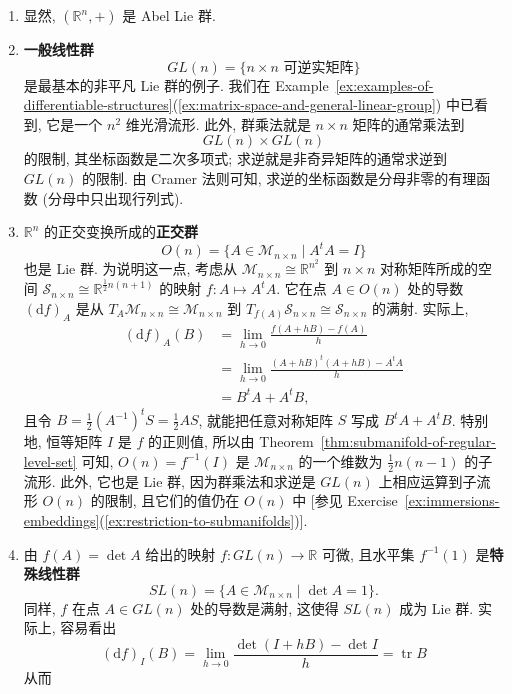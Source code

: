 \begin{RiemannExample}\label{ex:classical-matrix-lie-groups}
\begin{enumerate}[label=(\arabic*),ref=\arabic*,leftmargin=*]
\item 显然, $(\mathbb{R}^n,+)$ 是 Abel Lie 群.
\item \textbf{一般线性群}
\[
  GL(n)=\{n\times n\text{ 可逆实矩阵}\}
\]
是最基本的非平凡 Lie 群的例子. 我们在 Example~\ref{ex:examples-of-differentiable-structures}(\ref{ex:matrix-space-and-general-linear-group}) 中已看到, 它是一个 $n^2$ 维光滑流形. 此外, 群乘法就是 $n\times n$ 矩阵的通常乘法到
\[
  GL(n)\times GL(n)
\]
的限制, 其坐标函数是二次多项式; 求逆就是非奇异矩阵的通常求逆到 $GL(n)$ 的限制. 由 Cramer 法则可知, 求逆的坐标函数是分母非零的有理函数 (分母中只出现行列式).
\item\label{ex:orthogonal-group-regular-level-set} $\mathbb{R}^n$ 的正交变换所成的\textbf{正交群}
\[
  O(n)=\{A\in\mathcal M_{n\times n}\mid A^tA=I\}
\]
也是 Lie 群. 为说明这一点, 考虑从 $\mathcal M_{n\times n}\cong\mathbb{R}^{n^2}$ 到 $n\times n$ 对称矩阵所成的空间 $\mathcal S_{n\times n}\cong\mathbb{R}^{\frac12 n(n+1)}$ 的映射 $f:A\mapsto A^tA$. 它在点 $A\in O(n)$ 处的导数 $(\mathrm{d}f)_A$ 是从 $T_A\mathcal M_{n\times n}\cong\mathcal M_{n\times n}$ 到 $T_{f(A)}\mathcal S_{n\times n}\cong\mathcal S_{n\times n}$ 的满射. 实际上,
\begin{align*}
  (\mathrm{d}f)_A(B)
  &=\lim_{h\to0}\frac{f(A+hB)-f(A)}{h}\\
  &=\lim_{h\to0}\frac{(A+hB)^t(A+hB)-A^tA}{h}\\
  &=B^tA+A^tB,
\end{align*}
且令 $B=\frac12(A^{-1})^tS=\frac12 AS$, 就能把任意对称矩阵 $S$ 写成 $B^tA+A^tB$. 特别地, 恒等矩阵 $I$ 是 $f$ 的正则值, 所以由 Theorem~\ref{thm:submanifold-of-regular-level-set} 可知, $O(n)=f^{-1}(I)$ 是 $\mathcal M_{n\times n}$ 的一个维数为 $\frac12 n(n-1)$ 的子流形. 此外, 它也是 Lie 群, 因为群乘法和求逆是 $GL(n)$ 上相应运算到子流形 $O(n)$ 的限制, 且它们的值仍在 $O(n)$ 中 [参见 Exercise~\ref{ex:immersions-embeddings}(\ref{ex:restriction-to-submanifolds})].
\item\label{ex:special-linear-group-regular-level-set} 由 $f(A)=\det A$ 给出的映射 $f:GL(n)\to\mathbb{R}$ 可微, 且水平集 $f^{-1}(1)$ 是\textbf{特殊线性群}
\[
  SL(n)=\{A\in\mathcal M_{n\times n}\mid\det A=1\}.
\]
同样, $f$ 在点 $A\in GL(n)$ 处的导数是满射, 这使得 $SL(n)$ 成为 Lie 群. 实际上, 容易看出
\[
  (\mathrm{d}f)_I(B)=\lim_{h\to0}\frac{\det(I+hB)-\det I}{h}
  =\operatorname{tr}B
\]
从而
\begin{align*}

\end{align*}
\end{enumerate}
\end{RiemannExample}
